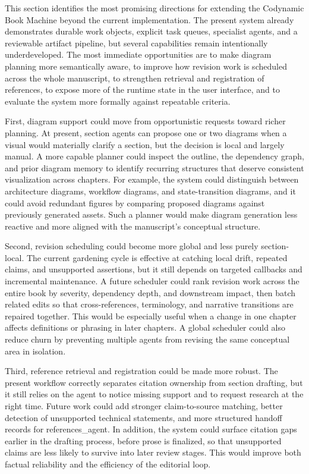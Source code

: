 This section identifies the most promising directions for extending the Codynamic Book Machine beyond the current implementation. The present system already demonstrates durable work objects, explicit task queues, specialist agents, and a reviewable artifact pipeline, but several capabilities remain intentionally underdeveloped. The most immediate opportunities are to make diagram planning more semantically aware, to improve how revision work is scheduled across the whole manuscript, to strengthen retrieval and registration of references, to expose more of the runtime state in the user interface, and to evaluate the system more formally against repeatable criteria.

First, diagram support could move from opportunistic requests toward richer planning. At present, section agents can propose one or two diagrams when a visual would materially clarify a section, but the decision is local and largely manual. A more capable planner could inspect the outline, the dependency graph, and prior diagram memory to identify recurring structures that deserve consistent visualization across chapters. For example, the system could distinguish between architecture diagrams, workflow diagrams, and state-transition diagrams, and it could avoid redundant figures by comparing proposed diagrams against previously generated assets. Such a planner would make diagram generation less reactive and more aligned with the manuscript's conceptual structure.

Second, revision scheduling could become more global and less purely section-local. The current gardening cycle is effective at catching local drift, repeated claims, and unsupported assertions, but it still depends on targeted callbacks and incremental maintenance. A future scheduler could rank revision work across the entire book by severity, dependency depth, and downstream impact, then batch related edits so that cross-references, terminology, and narrative transitions are repaired together. This would be especially useful when a change in one chapter affects definitions or phrasing in later chapters. A global scheduler could also reduce churn by preventing multiple agents from revising the same conceptual area in isolation.

Third, reference retrieval and registration could be made more robust. The present workflow correctly separates citation ownership from section drafting, but it still relies on the agent to notice missing support and to request research at the right time. Future work could add stronger claim-to-source matching, better detection of unsupported technical statements, and more structured handoff records for references\_agent. In addition, the system could surface citation gaps earlier in the drafting process, before prose is finalized, so that unsupported claims are less likely to survive into later review stages. This would improve both factual reliability and the efficiency of the editorial loop.

